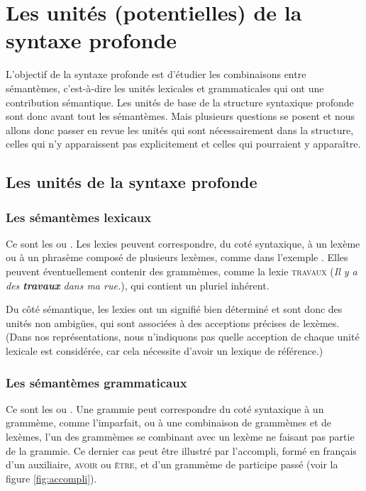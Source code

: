 \section{Les unités (potentielles) de la syntaxe profonde}
\label{sec:13-unites}
L’objectif de la syntaxe profonde est d’étudier les combinaisons entre sémantèmes, c’est-à-dire les unités lexicales et grammaticales qui ont une contribution sémantique. Les unités de base de la structure syntaxique profonde sont donc avant tout les sémantèmes. Mais plusieurs questions se posent et nous allons donc passer en revue les unités qui sont nécessairement dans la structure, celles qui n’y apparaissent pas explicitement et celles qui pourraient y apparaître.

\subsection{Les unités de la syntaxe profonde}

\subsubsection{Les sémantèmes lexicaux} 
Ce sont les  ou . Les lexies peuvent correspondre, du coté syntaxique, à un lexème ou à un phrasème composé de plusieurs lexèmes, comme  dans l’exemple . Elles peuvent éventuellement contenir des grammèmes, comme la lexie \textsc{travaux} (\textit{Il y a des \textbf{travaux} dans ma rue.}), qui contient un pluriel inhérent.

Du côté sémantique, les lexies ont un signifié bien déterminé et sont donc des unités non ambigües, qui sont associées à des acceptions précises de lexèmes. (Dans nos représentations, nous n’indiquons pas quelle acception de chaque unité lexicale est considérée, car cela nécessite d’avoir un lexique de référence.)

\subsubsection{Les sémantèmes grammaticaux} 
Ce sont les  ou . Une grammie peut correspondre du coté syntaxique à un grammème, comme l’imparfait, ou à une combinaison de grammèmes et de lexèmes, l’un des grammèmes se combinant avec un lexème ne faisant pas partie de la grammie. Ce dernier cas peut être illustré par l’accompli, formé en français d’un auxiliaire, \textsc{avoir} ou \textsc{être}, et d’un grammème de participe passé (voir la figure \ref{fig:accompli}).

